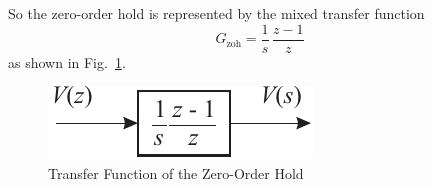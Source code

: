 So the zero-order hold is represented by the mixed transfer function
\begin{equation}
  \label{eq:l11e10}
  G_{\mathrm{zoh}}=\frac{1}{s}\,\frac{z-1}{z}
\end{equation}
as shown in Fig.~\ref{fig:l11f2}.
\begin{figure}[htbp]
  \begin{center}
    \includegraphics{pictures/zohtf.pdf}
    \caption{Transfer Function of the Zero-Order Hold}
    \label{fig:l11f2}
  \end{center}
\end{figure}
\endinput
